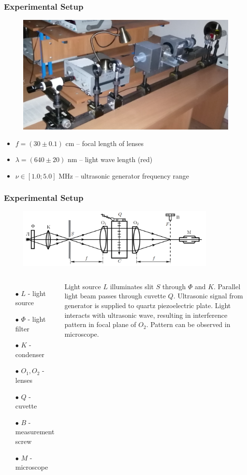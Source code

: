 \documentclass{beamer}
\begin{document}
	\begin{frame}
		\frametitle{Experimental Setup}
		\begin{figure}
			\centering
			\includegraphics[width=0.8\linewidth]{res/real_setup.png}
		\end{figure}
		
		\begin{itemize}
			\item $f = (30 \pm 0.1)$ cm -- focal length of lenses
			\item $\lambda = (640 \pm 20)$ nm -- light wave length (red)
			\item $\nu \in [1.0; 5.0]$ MHz -- ultrasonic generator frequency range
			
		\end{itemize}		
	\end{frame}
	

	\begin{frame}
		\frametitle{Experimental Setup}
		\begin{figure}
			\centering
			\includegraphics[width=10cm]{res/setup1.png}
		\end{figure}
		
		\begin{columns}
			\column{0.35\textwidth}
			\begin{enumerate}
				\item[$\bullet$] $L$ - light source
				\item[$\bullet$] $\Phi$ - light filter
				\item[$\bullet$] $K$ - condenser
				\item[$\bullet$] $O_1, O_2$ - lenses
				\item[$\bullet$] $Q$ - cuvette
				\item[$\bullet$] $B$ - measurement screw
				\item[$\bullet$] $M$ - microscope
			\end{enumerate}
			\column{0.70\linewidth}
			Light source $L$ illuminates slit $S$ through $\Phi$ and $K$. Parallel light beam passes through cuvette $Q$. Ultrasonic signal from generator is supplied to quartz piezoelectric plate. Light interacts with ultrasonic wave, resulting in interference pattern in focal plane of $O_2$. Pattern can be observed in microscope.
		\end{columns}
	\end{frame}
	
\end{document}
